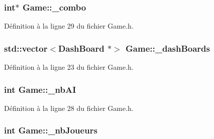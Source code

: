 \hypertarget{a00008_a767c9632e60bc307680766395ecb9b1b}{
\subsubsection[{\_\-combo}]{\setlength{\rightskip}{0pt plus 5cm}int$\ast$ {\bf Game::\_\-combo}}}
\label{a00008_a767c9632e60bc307680766395ecb9b1b}


Définition à la ligne 29 du fichier Game.h.

\hypertarget{a00008_a45fee55be795271d23513ebea986e77e}{
\subsubsection[{\_\-dashBoards}]{\setlength{\rightskip}{0pt plus 5cm}std::vector$<${\bf DashBoard} $\ast$$>$ {\bf Game::\_\-dashBoards}}}
\label{a00008_a45fee55be795271d23513ebea986e77e}


Définition à la ligne 23 du fichier Game.h.

\hypertarget{a00008_a4c0eee968b713100c74cde5aa6e984e0}{
\subsubsection[{\_\-nbAI}]{\setlength{\rightskip}{0pt plus 5cm}int {\bf Game::\_\-nbAI}}}
\label{a00008_a4c0eee968b713100c74cde5aa6e984e0}


Définition à la ligne 28 du fichier Game.h.

\hypertarget{a00008_a44492b721749d5d05a7a28842af710a8}{
\subsubsection[{\_\-nbJoueurs}]{\setlength{\rightskip}{0pt plus 5cm}int {\bf Game::\_\-nbJoueurs}}}
\label{a00008_a44492b721749d5d05a7a28842af710a8}


